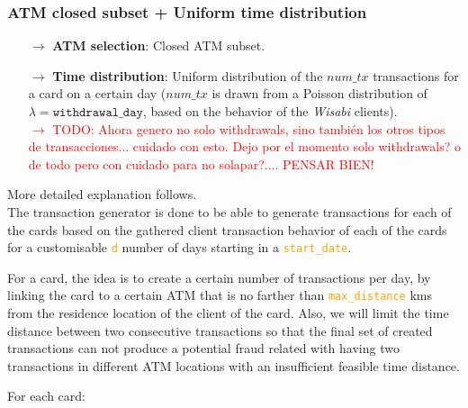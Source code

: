 \documentclass{article}
\begin{document}
\subsubsection{ATM closed subset + Uniform time distribution}

\begin{tcolorbox}
  \begin{itemize}
    \item[$\rightarrow$] \textbf{ATM selection}: Closed ATM subset.
    \item[$\rightarrow$] \textbf{Time distribution}: Uniform distribution of the $num\_tx$ transactions 
    for a card on a certain day ($num\_tx$ is drawn from a Poisson distribution of 
    $\lambda = \texttt{withdrawal\_day}$, based on the behavior of the \emph{Wisabi} clients).\\
    \textcolor{red}{$\rightarrow$ TODO: Ahora genero no solo withdrawals, sino también los otros 
    tipos de transacciones... cuidado con esto. Dejo por el momento solo withdrawals? o de todo pero con cuidado para no solapar?.... PENSAR BIEN!}
  \end{itemize}
\end{tcolorbox}

More detailed explanation follows.
\\


The transaction generator is done to be able to generate transactions for 
each of the cards based on the gathered client transaction behavior of each of the cards 
for a customisable \textcolor{orange}{\texttt{d}} number of days starting in a 
\textcolor{orange}{\texttt{start\_date}}. 

For a card, the idea is to create a certain 
number of transactions per day, by linking the card to a certain ATM that is no farther 
than \textcolor{orange}{\texttt{max\_distance}} kms from the residence location of the 
client of the card. Also, we will limit the time distance between two consecutive 
transactions so that the final set of created transactions can not produce a potential 
fraud related with having two transactions in different ATM locations with an insufficient 
feasible time distance.

For each card:  
\end{document}
